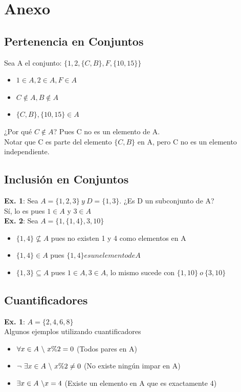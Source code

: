 \documentclass[10pt,a4paper]{article}
\begin{document}
\section*{Anexo}
\subsection*{Pertenencia en Conjuntos}
\label{subsec:pertenecencia_conjuntos}
Sea A el conjunto: $\{1, 2, \{C, B\}, F, \{10, 15\}\}$
\begin{itemize}
    \item $ 1 \in A, 2 \in A, F \in A $
    \item $ C \notin A, B \notin A $
    \item $  \{C, B\}, \{10, 15\} \in A $
\end{itemize}
¿Por qué $C \notin A$? Pues C no es un elemento de A.\\ Notar que C es parte del elemento $\{C, B\}$ en A, pero C no es un elemento independiente.
\subsection*{Inclusión en Conjuntos}
\label{subsec:inclusion_conjuntos}
\textbf{Ex. 1}: Sea $A = \{1, 2, 3\} \ y \ D = \{1, 3\}$. ¿Es D un subconjunto de A? \\
Sí, lo es pues $1 \in A$ y $ 3 \in A$ \\
\textbf{Ex. 2}: Sea $A = \{1, \{1, 4\}, 3, 10\}$
\begin{itemize}
    \item $ \{1, 4\} \nsubseteq A $ pues no existen 1 y 4 como elementos en A
    \item $ \{1, 4\} \in A $ pues $\{1, 4\} es un elemento de A$
    \item $\{1, 3\} \subseteq A$ pues $ 1 \in A, 3 \in A$, lo mismo sucede con $ \{1, 10\} \ o \ \{3, 10\}$
\end{itemize}
\subsection*{Cuantificadores}
\label{subsec:cuantificadores}
\textbf{Ex. 1}: $A = \{2, 4, 6, 8\}$ \\
Algunos ejemplos utilizando cuantificadores 
\begin{itemize}
    \item $\forall x \in A \ \symbol{92} \ x \% 2 = 0$ (Todos pares en A)
    \item $\neg \ \exists x \in A \ \symbol{92} \ x \% 2 \neq 0$ (No existe ningún impar en A) 
    \item $ \exists x \in A \ \symbol{92} x = 4$ (Existe un elemento en A que es exactamente 4)
\end{itemize}
\end{document}
